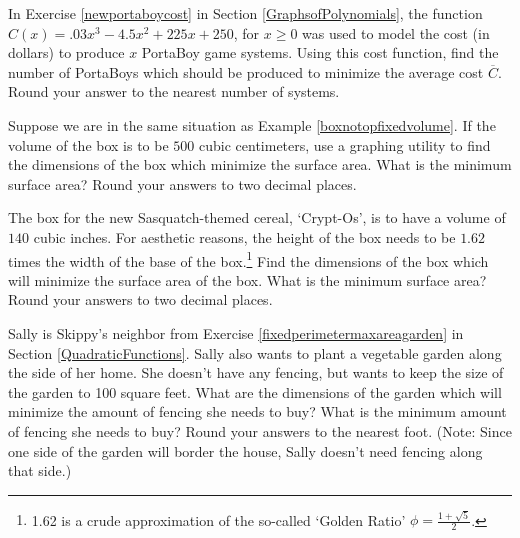\documentclass{ximera}
\begin{document}
\begin{problem}
In Exercise \ref{newportaboycost} in Section \ref{GraphsofPolynomials},  the function $C(x) = .03x^{3} - 4.5x^{2} + 225x + 250$, for $x \geq 0$ was used to model the cost (in dollars) to produce $x$ PortaBoy game systems. Using this cost function, find the number of PortaBoys which should be produced to minimize the average cost $\overline{C}$.  Round your answer to the nearest number of systems.     
\end{problem}  

\begin{problem}
Suppose we are in the same situation as Example \ref{boxnotopfixedvolume}.  If the volume of the box is to be $500$ cubic centimeters, use a graphing utility to find the dimensions of the box which minimize the surface area.  What is the minimum surface area?  Round your answers to two decimal places.
\end{problem} 

\begin{problem}
The box for the new Sasquatch-themed cereal, `Crypt-Os', is to have a volume of $140$ cubic inches.  For aesthetic reasons, the height of the box needs to be $1.62$ times the width of the base of the box.\footnote{1.62 is a crude approximation of the so-called `Golden Ratio' $\phi = \frac{1 + \sqrt{5}}{2}$.}  Find the dimensions of the box which will minimize the surface area of the box.  What is the minimum surface area?  Round your answers to two decimal places.   
\end{problem}   

\begin{problem}\label{fixedareaminperimetergarden} 
Sally is Skippy's neighbor from Exercise \ref{fixedperimetermaxareagarden} in Section \ref{QuadraticFunctions}.   Sally also wants to plant a vegetable garden along the side of her home.  She doesn't have any fencing, but wants to keep the size of the garden to 100 square feet.  What are the dimensions of the garden which will minimize the amount of fencing she needs to buy?  What is the minimum amount of fencing she needs to buy? Round your answers to the nearest foot. (Note:  Since one side of the garden will border the house, Sally doesn't need fencing along that side.)
\end{problem}
\end{document}
